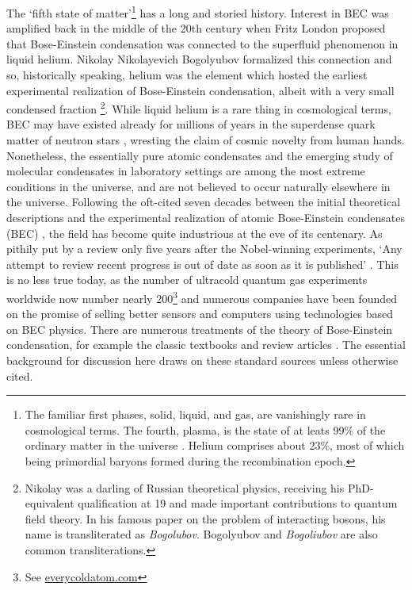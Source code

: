 	The `fifth state of matter'\footnote{The familiar first phases, solid, liquid, and gas, are vanishingly rare in cosmological terms.
	The fourth, plasma, is the state of at leats 99\% of the ordinary matter in the universe \cite{plasmastuff}.
	Helium comprises about 23\%, most of which being primordial baryons formed during the recombination epoch.}  has a long and storied history\cite{mukundanote}.
	Interest in BEC was amplified back in the middle of the 20th century when Fritz London proposed that Bose-Einstein condensation was connected to the superfluid phenomenon in liquid helium.
	Nikolay Nikolayevich Bogolyubov formalized this connection and so, historically speaking, helium was the element which hosted the earliest experimental realization of Bose-Einstein condensation, albeit with a very small condensed fraction \footnote{Nikolay was a darling of Russian theoretical physics, receiving his PhD-equivalent qualification at 19 and made important contributions to quantum field theory. In his famous paper on the problem of interacting bosons, his name is transliterated as \emph{Bogolubov}. Bogolyubov and \emph{Bogoliubov} are also common transliterations.}.
	While liquid helium is a rare thing in cosmological terms, BEC may have existed already for millions of years in the superdense quark matter of neutron stars \cite{haskell18, martin16,baym69,page11}, wresting the claim of cosmic novelty from human hands. 
	Nonetheless, the essentially pure atomic condensates and the emerging study of molecular condensates in laboratory settings are among the most extreme conditions in the universe, and are not believed to occur naturally elsewhere in the universe.
	Following the oft-cited seven decades between the initial theoretical descriptions and the experimental realization of atomic Bose-Einstein condensates (BEC) \cite{anderson95,davis95,bradley95}, the field has become quite industrious at the eve of its centenary.
	As pithily put by a review only five years after the Nobel-winning experiments, `Any attempt to review recent progress is out of date as soon as it is published' \cite{courteille01}.
	This is no less true today, as the number of ultracold quantum gas experiments worldwide now number nearly 200\footnote{See \url{everycoldatom.com}} and numerous companies have been founded on the promise of selling better sensors and computers using technologies based on BEC physics.
	There are numerous treatments of the theory of Bose-Einstein condensation, for example the classic textbooks \cite{PitaevskiiStringari,PethickSmith} and review articles \cite{DalfovoReview, yukalov11_basics,courteille01}.
	The essential background for discussion here draws on these standard sources unless otherwise cited.


